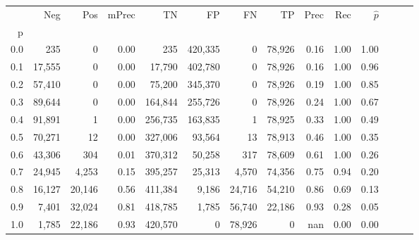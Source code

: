 \begin{tabular}{rrrrrrrrrrrrrr}
\toprule
{} &     Neg &     Pos & mPrec &       TN &       FP &      FN &      TP &  Prec &   Rec & $\hat{p}$ \\
p   &         &         &       &          &          &         &         &       &       &           \\
\midrule
0.0 &     235 &       0 &  0.00 &      235 &  420,335 &       0 &  78,926 &  0.16 &  1.00 &      1.00 \\
0.1 &  17,555 &       0 &  0.00 &   17,790 &  402,780 &       0 &  78,926 &  0.16 &  1.00 &      0.96 \\
0.2 &  57,410 &       0 &  0.00 &   75,200 &  345,370 &       0 &  78,926 &  0.19 &  1.00 &      0.85 \\
0.3 &  89,644 &       0 &  0.00 &  164,844 &  255,726 &       0 &  78,926 &  0.24 &  1.00 &      0.67 \\
0.4 &  91,891 &       1 &  0.00 &  256,735 &  163,835 &       1 &  78,925 &  0.33 &  1.00 &      0.49 \\
0.5 &  70,271 &      12 &  0.00 &  327,006 &   93,564 &      13 &  78,913 &  0.46 &  1.00 &      0.35 \\
0.6 &  43,306 &     304 &  0.01 &  370,312 &   50,258 &     317 &  78,609 &  0.61 &  1.00 &      0.26 \\
0.7 &  24,945 &   4,253 &  0.15 &  395,257 &   25,313 &   4,570 &  74,356 &  0.75 &  0.94 &      0.20 \\
0.8 &  16,127 &  20,146 &  0.56 &  411,384 &    9,186 &  24,716 &  54,210 &  0.86 &  0.69 &      0.13 \\
0.9 &   7,401 &  32,024 &  0.81 &  418,785 &    1,785 &  56,740 &  22,186 &  0.93 &  0.28 &      0.05 \\
1.0 &   1,785 &  22,186 &  0.93 &  420,570 &        0 &  78,926 &       0 &   nan &  0.00 &      0.00 \\
\bottomrule
\end{tabular}
